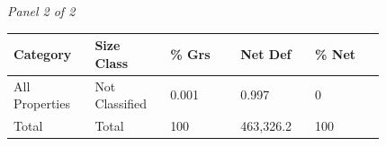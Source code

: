 \documentclass[12pt]{article}
\begin{document}
\begin{landscape}
\begin{table}[H]
\vspace{0.6em}

\textit{Panel 2 of 2}\\[2pt]
{\fontsize{12}{14}\selectfont
\setlength{\tabcolsep}{3pt}
\renewcommand{\arraystretch}{1.08}
\begin{tabular}{p{0.164\linewidth}p{0.164\linewidth}p{0.164\linewidth}p{0.164\linewidth}p{0.164\linewidth}}
\toprule
Category & Size Class & \% Grs & Net Def & \% Net \\
\midrule
All Properties & Not Classified & 0.001 & 0.997 & 0 \\
Total & Total & 100 & 463,326.2 & 100 \\
\bottomrule
\end{tabular}
}
\end{table}
\end{landscape}
\end{document}
